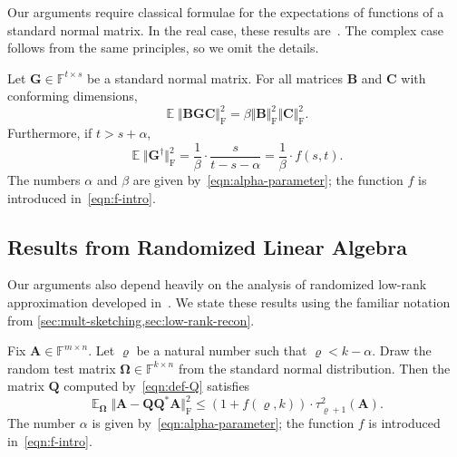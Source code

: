 \documentclass[final]{siamart1116}
\numberwithin{equation}{section}
\numberwithin{theorem}{section}
\numberwithin{figure}{section}
\newcommand{\F}{\mathbb{F}}
\newcommand{\mtx}[1]{\bm{#1}}
\newcommand{\norm}[1]{\Vert #1 \Vert}
\newcommand{\fnorm}[1]{\norm{#1}_{\mathrm{F}}}
\newcommand{\fnormsq}[1]{\fnorm{#1}^2}
\newcommand{\Expect}{\operatorname{\mathbb{E}}}
\begin{document}
Our arguments require classical formulae for the expectations
of functions of a standard normal matrix.  In the real case,
these results are~\cite[Prop.~A.1 and A.6]{HMT11:Finding-Structure}.
The complex case follows from the same principles, so we omit the details.

\begin{fact} \label{fact:expect-gauss-frob}
Let $\mtx{G} \in \F^{t \times s}$ be a standard normal matrix.
For all matrices $\mtx{B}$ and $\mtx{C}$ with conforming dimensions,
\begin{equation} \label{eqn:expect-gauss-frob}
\Expect \fnormsq{ \mtx{BGC} } = \beta \fnormsq{\mtx{B}} \fnormsq{\mtx{C}}.
\end{equation}
Furthermore, if $t > s + \alpha$,
\begin{equation} \label{eqn:expect-gauss-pinv-frob}
\Expect \fnormsq{\mtx{G}^\dagger} = \frac{1}{\beta} \cdot \frac{s}{t - s - \alpha}
	= \frac{1}{\beta} \cdot f(s, t).
\end{equation}
The numbers $\alpha$ and $\beta$ are given by~\cref{eqn:alpha-parameter};
the function $f$ is introduced in~\cref{eqn:f-intro}.
\end{fact}








\subsection{Results from Randomized Linear Algebra}

Our arguments also depend heavily on the analysis of randomized
low-rank approximation developed in~\cite[Sec.~10]{HMT11:Finding-Structure}.
We state these results using the familiar notation
from \cref{sec:mult-sketching,sec:low-rank-recon}.





\begin{fact}[Halko et al.~2011] \label{fact:hmt-err}
Fix $\mtx{A} \in \F^{m \times n}$.  Let $\varrho$ be a natural number
such that $\varrho < k - \alpha$.
Draw the random test matrix $\mtx{\Omega} \in \F^{k \times n}$
from the standard normal distribution.
Then the matrix $\mtx{Q}$ computed by~\cref{eqn:def-Q} satisfies
$$
\Expect_{\mtx{\Omega}} \fnormsq{ \mtx{A} - \mtx{QQ}^* \mtx{A} }
	\leq (1 + f(\varrho, k)) \cdot \tau_{\varrho+1}^2(\mtx{A}).
$$
The number $\alpha$ is given by~\cref{eqn:alpha-parameter};
the function $f$ is introduced in~\cref{eqn:f-intro}.
\end{fact}
\end{document}
